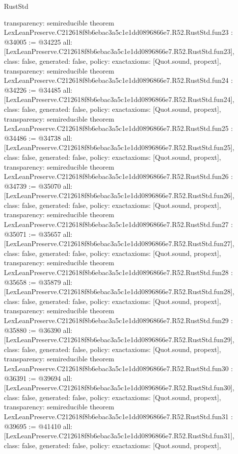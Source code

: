 \begin{lexlean}{RustStd}
\begin{coremodule}
{  transparency: semireducible
}
theorem LexLeanPreserve.C212618f8b6ebac3a5c1e1dd0896866e7.R52.RustStd.fun23 : @34005 := @34225 {
  all: [LexLeanPreserve.C212618f8b6ebac3a5c1e1dd0896866e7.R52.RustStd.fun23],
  class: false,
  generated: false,
  policy: exact{axioms: [Quot.sound, propext]},
  transparency: semireducible
}
theorem LexLeanPreserve.C212618f8b6ebac3a5c1e1dd0896866e7.R52.RustStd.fun24 : @34226 := @34485 {
  all: [LexLeanPreserve.C212618f8b6ebac3a5c1e1dd0896866e7.R52.RustStd.fun24],
  class: false,
  generated: false,
  policy: exact{axioms: [Quot.sound, propext]},
  transparency: semireducible
}
theorem LexLeanPreserve.C212618f8b6ebac3a5c1e1dd0896866e7.R52.RustStd.fun25 : @34486 := @34738 {
  all: [LexLeanPreserve.C212618f8b6ebac3a5c1e1dd0896866e7.R52.RustStd.fun25],
  class: false,
  generated: false,
  policy: exact{axioms: [Quot.sound, propext]},
  transparency: semireducible
}
theorem LexLeanPreserve.C212618f8b6ebac3a5c1e1dd0896866e7.R52.RustStd.fun26 : @34739 := @35070 {
  all: [LexLeanPreserve.C212618f8b6ebac3a5c1e1dd0896866e7.R52.RustStd.fun26],
  class: false,
  generated: false,
  policy: exact{axioms: [Quot.sound, propext]},
  transparency: semireducible
}
theorem LexLeanPreserve.C212618f8b6ebac3a5c1e1dd0896866e7.R52.RustStd.fun27 : @35071 := @35657 {
  all: [LexLeanPreserve.C212618f8b6ebac3a5c1e1dd0896866e7.R52.RustStd.fun27],
  class: false,
  generated: false,
  policy: exact{axioms: [Quot.sound, propext]},
  transparency: semireducible
}
theorem LexLeanPreserve.C212618f8b6ebac3a5c1e1dd0896866e7.R52.RustStd.fun28 : @35658 := @35879 {
  all: [LexLeanPreserve.C212618f8b6ebac3a5c1e1dd0896866e7.R52.RustStd.fun28],
  class: false,
  generated: false,
  policy: exact{axioms: [Quot.sound, propext]},
  transparency: semireducible
}
theorem LexLeanPreserve.C212618f8b6ebac3a5c1e1dd0896866e7.R52.RustStd.fun29 : @35880 := @36390 {
  all: [LexLeanPreserve.C212618f8b6ebac3a5c1e1dd0896866e7.R52.RustStd.fun29],
  class: false,
  generated: false,
  policy: exact{axioms: [Quot.sound, propext]},
  transparency: semireducible
}
theorem LexLeanPreserve.C212618f8b6ebac3a5c1e1dd0896866e7.R52.RustStd.fun30 : @36391 := @39694 {
  all: [LexLeanPreserve.C212618f8b6ebac3a5c1e1dd0896866e7.R52.RustStd.fun30],
  class: false,
  generated: false,
  policy: exact{axioms: [Quot.sound, propext]},
  transparency: semireducible
}
theorem LexLeanPreserve.C212618f8b6ebac3a5c1e1dd0896866e7.R52.RustStd.fun31 : @39695 := @41410 {
  all: [LexLeanPreserve.C212618f8b6ebac3a5c1e1dd0896866e7.R52.RustStd.fun31],
  class: false,
  generated: false,
  policy: exact{axioms: [Quot.sound, propext]},
}
\end{coremodule}
\end{lexlean}
